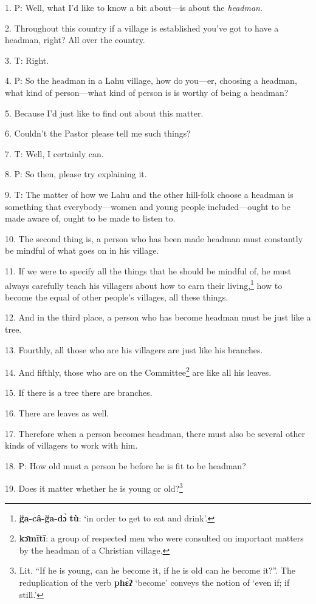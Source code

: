 \setcounter{footnote}{0}

1. P: Well, what I'd like to know a bit about---is about the \textit{headman}.

2. Throughout this country if a village is established you've got to have a headman,
right? All over the country.

3. T: Right.

4. P: So the headman in a Lahu village, how do you---er, choosing a headman, what
kind of person---what kind of person is is worthy of being a headman?

5. Because I'd just like to find out about this matter.

6. Couldn't the Pastor please tell me such things?

7. T: Well, I certainly can.

8. P: So then, please try explaining it.

9. T: The matter of how we Lahu and the other hill-folk choose a headman is something
that everybody---women and young people included---ought to be made aware of, ought
to be made to listen to.

10. The second thing is, a person who has been made headman must constantly be
mindful of what goes on in his village.

11. If we were to specify all the things that he should be mindful of, he must
always carefully teach his villagers about how to earn their living,\footnote{\textbf{g̈a-câ-g̈a-dɔ̀} \textbf{tù}: `in order to get to eat and drink'.} how to
become the equal of other people's villages, all these things.

12. And in the third place, a person who has become headman must be just like a
tree.

13. Fourthly, all those who are his villagers are just like his branches.

14. And fifthly, those who are on the Committee\footnote{\textbf{kɔ̄mītī}: a group of respected men who were consulted on important matters by the headman of a Christian village.} are like all his leaves.

15. If there is a tree there are branches.

16. There are leaves as well.

17. Therefore when a person becomes headman, there must also be several other kinds
of villagers to work with him.

18. P: How old must a person be before he is fit to be headman?

19. Does it matter whether he is young or old?\footnote{Lit. ``If he is young, can he become it, if he is old can he become it?''. The reduplication of the verb \textbf{phɛ̀ʔ} `become' conveys the notion of `even if; if still.'}

